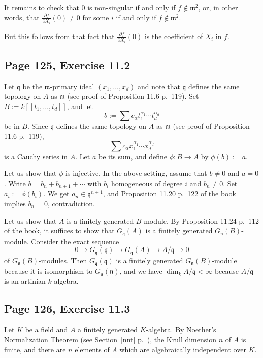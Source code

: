 \documentclass[parskip=half,fontsize=12pt]{scrartcl}%
\newcommand{\mf}{\mathfrak}
\newcommand{\mmm}{\mf m}
\newcommand{\nnn}{\mf n}
\newcommand{\qqq}{\mf q}
\begin{document}
It remains to check that $0$ is non-singular if and only if $f\not\in\mmm^2$, or, in other words, that $\frac{\partial f}{\partial X_i}(0)\ne0$ for some $i$ if and only if $f\not\in\mmm^2$. 

But this follows from that fact that $\frac{\partial f}{\partial X_i}(0)$ is the coefficient of $X_i$ in $f$. %

\subsection{Page 125, Exercise 11.2}%

Let $\qqq$ be the $\mmm$-primary ideal $(x_1,\ldots,x_d)$ and note that $\qqq$ defines the same topology on $A$ as $\mmm$ (see proof of Proposition 11.6 p.~119). Set $B:=k[[t_1,\ldots,t_d]]$, and let 
$$
b:=\sum c_\alpha t_1^{\alpha_1}\cdots t_d^{\alpha_d}
$$ 
be in $B$. Since $\qqq$ defines the same topology on $A$ as $\mmm$ (see proof of Proposition 11.6 p.~119), 
$$
\sum c_\alpha x_1^{\alpha_1}\cdots x_d^{\alpha_d}
$$ 
is a Cauchy series in $A$. Let $a$ be its sum, and define $\phi:B\to A$ by $\phi(b):=a$. 

Let us show that $\phi$ is injective. In the above setting, assume that $b\ne0$ and $a=0$. Write $b=b_n+b_{n+1}+\cdots$ with $b_i$ homogeneous of degree $i$ and $b_n\ne0$. Set $a_i:=\phi(b_i)$. We get $a_n\in\qqq^{n+1}$, and Proposition 11.20 p.~122 of the book implies $b_n=0$, contradiction. 

Let us show that $A$ is a finitely generated $B$-module. By Proposition 11.24 p.~112 of the book, it suffices to show that $G_\qqq(A)$ is a finitely generated $G_\nnn(B)$-module. Consider the exact sequence 
$$
0\to G_\qqq(\qqq)\to G_\qqq(A)\to A/\qqq\to0
$$ 
of $G_\nnn(B)$-modules. Then $G_\qqq(\qqq)$ is a finitely generated $G_\nnn(B)$-module because it is isomorphism to $G_\nnn(\nnn)$, and we have $\dim_kA/\qqq<\infty$ because $A/\qqq$ is an artinian $k$-algebra. 

\subsection{Page 126, Exercise 11.3}%

Let $K$ be a field and $A$ a finitely generated $K$-algebra. By Noether's Normalization Theorem (see Section~\ref{nnt} p.~\pageref{nnt}), the Krull dimension $n$ of $A$ is finite, and there are $n$ elements of $A$ which are algebraically independent over $K$. 
\end{document}
